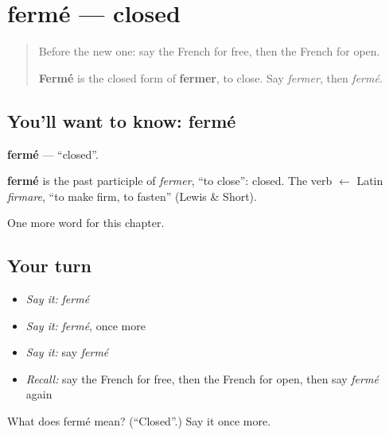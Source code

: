 \section[fermé]{fermé — closed}

\label{lesson:FR-C131-ferme}



\begin{quote}
Before the new one: say the French for free, then the French for open.

\textbf{Fermé} is the closed form of \textbf{fermer}, to close. Say \emph{fermer}, then \emph{fermé}.
\end{quote}

\subsection*{You'll want to know: fermé}
\textbf{fermé} — \textquotedblleft{}closed\textquotedblright{}.

\begin{cousinweb}
\textbf{fermé} is the past participle of \emph{fermer}, \textquotedblleft{}to close\textquotedblright{}: closed. The verb $\leftarrow$ Latin \emph{firmare}, \textquotedblleft{}to make firm, to fasten\textquotedblright{} (Lewis \& Short).
\end{cousinweb}

\begin{grammarlens}[title={What you've built}]
One more word for this chapter.
\end{grammarlens}

\subsection*{Your turn}
\begin{itemize}
\raggedright
  \item \emph{Say it:} \emph{fermé}
  \item \emph{Say it:} \emph{fermé}, once more
  \item \emph{Say it:} say \emph{fermé}
  \item \emph{Recall:} say the French for free, then the French for open, then say \emph{fermé} again
\end{itemize}

\begin{tcolorbox}[breakable,colback=teal!4,colframe=teal!35!black,title={Before you move on}]
What does fermé mean? (\textquotedblleft{}Closed\textquotedblright{}.) Say it once more.
\end{tcolorbox}
